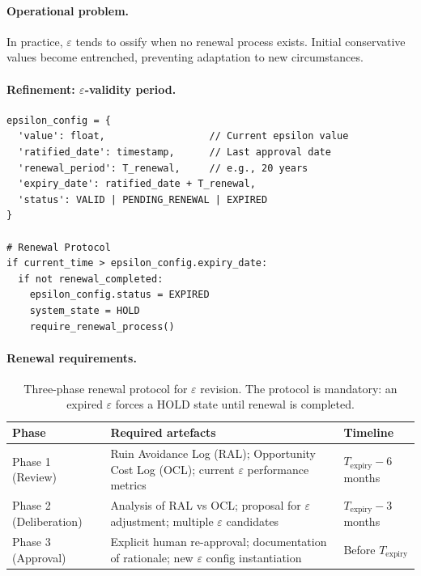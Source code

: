 \paragraph{Operational problem.}
In practice, $\varepsilon$ tends to ossify when no renewal process
exists. Initial conservative values become entrenched, preventing
adaptation to new circumstances.

\paragraph{Refinement: $\varepsilon$-validity period.}

\begin{lstlisting}[basicstyle=\ttfamily\small,frame=single]
epsilon_config = {
  'value': float,                  // Current epsilon value
  'ratified_date': timestamp,      // Last approval date
  'renewal_period': T_renewal,     // e.g., 20 years
  'expiry_date': ratified_date + T_renewal,
  'status': VALID | PENDING_RENEWAL | EXPIRED
}

# Renewal Protocol
if current_time > epsilon_config.expiry_date:
  if not renewal_completed:
    epsilon_config.status = EXPIRED
    system_state = HOLD
    require_renewal_process()
\end{lstlisting}

\paragraph{Renewal requirements.}

\begin{table}[ht]
\centering
\small
\begin{tabularx}{\linewidth}{lXl}
\toprule
\textbf{Phase} & \textbf{Required artefacts} & \textbf{Timeline} \\
\midrule
Phase 1 (Review)
& Ruin Avoidance Log (RAL); Opportunity Cost Log (OCL); current
$\varepsilon$ performance metrics
& $T_{\mathrm{expiry}} - 6$ months \\
Phase 2 (Deliberation)
& Analysis of RAL vs OCL; proposal for $\varepsilon$ adjustment;
multiple $\varepsilon$ candidates
& $T_{\mathrm{expiry}} - 3$ months \\
Phase 3 (Approval)
& Explicit human re-approval; documentation of rationale; new
$\varepsilon$ config instantiation
& Before $T_{\mathrm{expiry}}$ \\
\bottomrule
\end{tabularx}
\caption[$\varepsilon$ renewal protocol]{Three-phase renewal protocol
for $\varepsilon$ revision. The protocol is mandatory: an expired
$\varepsilon$ forces a HOLD state until renewal is completed.}
\label{tab:epsilon-renewal}
\end{table}

